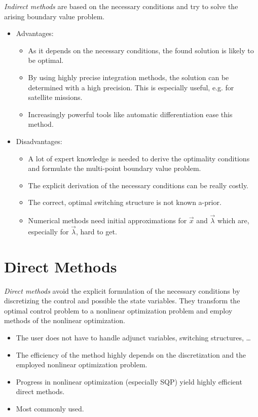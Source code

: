 		\emph{Indirect methods} are based on the necessary conditions and try to solve the arising boundary value problem.
		\begin{itemize}
			\item Advantages:
				\begin{itemize}
					\item As it depends on the necessary conditions, the found solution is likely to be optimal.
					\item By using highly precise integration methods, the solution can be determined with a high precision. This is especially useful, e.g. for satellite missions.
					\item Increasingly powerful tools like automatic differentiation ease this method.
				\end{itemize}
			\item Disadvantages:
				\begin{itemize}
					\item A lot of expert knowledge is needed to derive the optimality conditions and formulate the multi-point boundary value problem.
					\item The explicit derivation of the necessary conditions can be really costly.
					\item The correct, optimal switching structure is not known a-prior.
					\item Numerical methods need initial approximations for \(\vec{x}\) and \(\vec{\lambda}\) which are, especially for \(\vec{\lambda}\), hard to get.
				\end{itemize}
		\end{itemize}

	\section{Direct Methods}
		\emph{Direct methods} avoid the explicit formulation of the necessary conditions by discretizing the control and possible the state variables. They transform the optimal control problem to a nonlinear optimization problem and employ methods of the nonlinear optimization.
		\begin{itemize}
			\item The user does not have to handle adjunct variables, switching structures, \dots
			\item The efficiency of the method highly depends on the discretization and the employed nonlinear optimization problem.
			\item Progress in nonlinear optimization (especially SQP) yield highly efficient direct methods.
			\item Most commonly used.
		\end{itemize}

